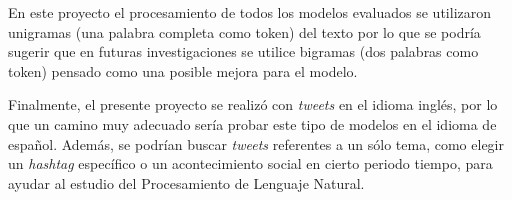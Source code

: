 \documentclass[sigconf, nonacm, spanish]{acmart}
\begin{document}
En este proyecto el procesamiento de todos los modelos evaluados se utilizaron unigramas (una palabra completa como token) del texto por lo que se podría sugerir que en futuras investigaciones se utilice bigramas (dos palabras como token) pensado como una posible mejora para el modelo. 

Finalmente, el presente proyecto se realizó con \textit{tweets} en el idioma inglés, por lo que un camino muy adecuado sería probar este tipo de modelos en el idioma de español. Además, se podrían buscar \textit{tweets} referentes a un sólo tema, como elegir un \textit{hashtag} específico o un acontecimiento social en cierto periodo tiempo, para ayudar al estudio del Procesamiento de Lenguaje Natural.






\end{document}
